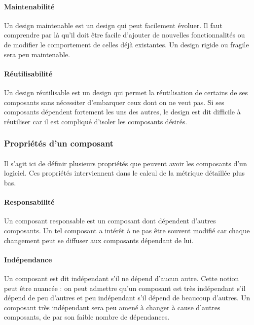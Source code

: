 \documentclass{scrartcl}
\begin{document}
    \paragraph{Maintenabilité}Un design maintenable est un design qui peut facilement évoluer. Il faut comprendre par là qu'il doit être facile d'ajouter de nouvelles fonctionnalités ou de modifier le comportement de celles déjà existantes. Un design rigide ou fragile sera peu maintenable.

    \paragraph{Réutilisabilité}Un design réutilisable est un design qui permet la réutilisation de certains de ses composants sans nécessiter d'embarquer ceux dont on ne veut pas. Si ses composants dépendent fortement les uns des autres, le design est dit difficile à réutiliser car il est compliqué d'isoler les composants désirés.
    
\subsubsection{Propriétés d'un composant}
\label{componentProperties}

    \paragraph{}Il s'agit ici de définir plusieurs propriétés que peuvent avoir les composants d'un logiciel. Ces propriétés interviennent dans le calcul de la métrique détaillée plus bas.
    
    \paragraph{Responsabilité}Un composant responsable est un composant dont dépendent d'autres composants. Un tel composant a intérêt à ne pas être souvent modifié car chaque changement peut se diffuser aux composants dépendant de lui.
    
    \paragraph{Indépendance}Un composant est dit indépendant s'il ne dépend d'aucun autre. Cette notion peut être nuancée : on peut admettre qu'un composant est très indépendant s'il dépend de peu d'autres et peu indépendant s'il dépend de beaucoup d'autres. Un composant très indépendant sera peu amené à changer à cause d'autres composants, de par son faible nombre de dépendances.
    
\end{document}
